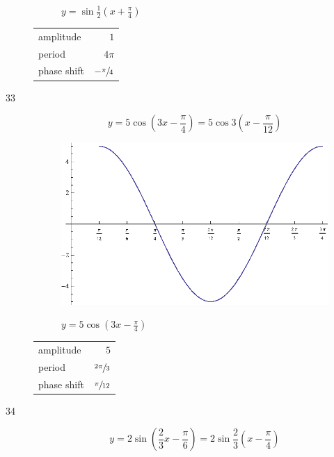 \documentclass{exam}
\begin{document}
\begin{description}
\begin{figure}[H]
          $y = \sin \frac{1}{2} \left( x + \frac{\pi}{4} \right)$
        \end{figure}

        \begin{tabular}[H]{lr}
          \toprule
          amplitude   & $1$ \\
          period      & $4 \pi$ \\
          phase shift & $- \sfrac{\pi}{4}$ \\
          \bottomrule
        \end{tabular}

      \pagebreak

      \item[33]
        \[
          y = 5 \cos \left( 3x - \frac{\pi}{4} \right) = 5 \cos 3 \left( x - \frac{\pi}{12} \right)
        \]

        \begin{figure}[H]
          \centering
          \includegraphics[scale=0.8]{exercise33.eps}

          $y = 5 \cos \left( 3x - \frac{\pi}{4} \right)$
        \end{figure}

        \begin{tabular}[H]{lr}
          \toprule
          amplitude   & $5$ \\
          period      & $\sfrac{2 \pi}{3}$ \\
          phase shift & $\sfrac{\pi}{12}$ \\
          \bottomrule
        \end{tabular}

      \pagebreak

      \item[34]
        \[
          y = 2 \sin \left( \frac{2}{3} x - \frac{\pi}{6} \right) = 2 \sin \frac{2}{3} \left( x - \frac{\pi}{4} \right)
        \]


\end{description}
\end{document}
